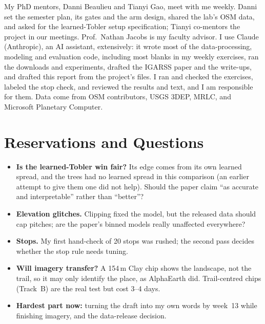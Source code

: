 \documentclass[10pt,twocolumn,letterpaper]{article}
\begin{document}
My PhD mentors, Danni Beaulieu and Tianyi Gao, meet with me weekly. Danni set the semester plan, its gates and the arm design, shared the lab's OSM data, and asked for the learned-Tobler setup specification; Tianyi co-mentors the project in our meetings. Prof.\ Nathan Jacobs is my faculty advisor. I use Claude (Anthropic), an AI assistant, extensively: it wrote most of the data-processing, modeling and evaluation code, including most blanks in my weekly exercises, ran the downloads and experiments, drafted the IGARSS paper and the write-ups, and drafted this report from the project's files. I ran and checked the exercises, labeled the stop check, and reviewed the results and text, and I am responsible for them. Data come from OSM contributors, USGS 3DEP, MRLC, and Microsoft Planetary Computer.

\section{Reservations and Questions}
\label{sec:questions}

\begin{itemize}\setlength\itemsep{1pt}
\item \textbf{Is the learned-Tobler win fair?} Its edge comes from its own learned spread, and the trees had no learned spread in this comparison (an earlier attempt to give them one did not help). Should the paper claim ``as accurate and interpretable'' rather than ``better''?
\item \textbf{Elevation glitches.} Clipping fixed the model, but the released data should cap pitches; are the paper's binned models really unaffected everywhere?
\item \textbf{Stops.} My first hand-check of 20 stops was rushed; the second pass decides whether the stop rule needs tuning.
\item \textbf{Will imagery transfer?} A 154\,m Clay chip shows the landscape, not the trail, so it may only identify the place, as AlphaEarth did. Trail-centred chips (Track~B) are the real test but cost 3--4 days.
\item \textbf{Hardest part now:} turning the draft into my own words by week~13 while finishing imagery, and the data-release decision.
\end{itemize}

{\footnotesize
\setlength{\itemsep}{0pt}\setlength{\parskip}{0pt}


}
\end{document}
